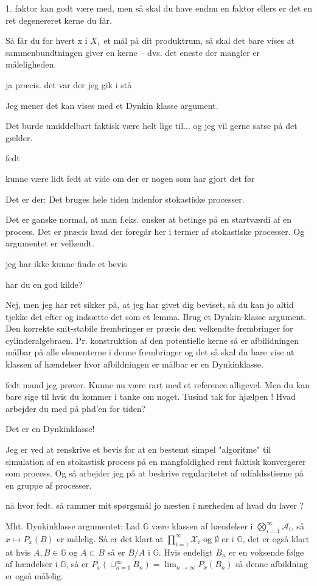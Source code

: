 \documentclass{article}
\begin{document}
1. faktor kan godt være med, men så skal du have endnu en faktor ellers er det en ret degenereret kerne du får.

Så får du for hvert x i $X_1$ et mål på dit produktrum, så skal det bare vises at sammenbundtningen giver en kerne -- dvs. det eneste der mangler er måleligheden.

ja præcis. det var der jeg gik i stå

Jeg mener det kan vises med et Dynkin klasse argument.

Det burde umiddelbart faktisk være helt lige til... og jeg vil gerne satse på det gælder.

fedt

kunne være lidt fedt at vide om der er nogen som har gjort det før

Det er der: Det bruges hele tiden indenfor stokastiske processer.

Det er ganske normal, at man f.eks. ønsker at betinge på en startværdi af en process. Det er præcis hvad der foregår her i termer af stokastiske processer. Og argumentet er velkendt.

jeg har ikke kunne finde et bevis

har du en god kilde?

Nej, men jeg har ret sikker på, at jeg har givet dig beviset, så du kan jo altid tjekke det efter og indsætte det som et lemma. Brug et Dynkin-klasse argument. Den korrekte snit-stabile frembringer er præcis den velkendte frembringer for cylinderalgebraen. Pr. konstruktion af den potentielle kerne så er afbilidningen målbar på alle elementerne i denne frembringer og det så skal du bare vise at klassen af hændelser hvor afbildningen er målbar er en Dynkinklasse.

fedt mand jeg prøver. Kunne nu være rart med et reference alligevel. Men du kan bare sige til hvis du kommer i tanke om noget. Tusind tak for hjælpen ! Hvad arbejder du med på phd’en for tiden?

Det er en Dynkinklasse! 

Jeg er ved at renskrive et bevis for at en bestemt simpel "algoritme" til simulation af en stokastisk process på en mangfoldighed rent faktisk konvergerer som process. Og så arbejder jeg på at beskrive regularitetet af udfaldsstierne på en gruppe af processer.

nå hvor fedt. så rammer mit spørgsmål jo næsten i nærheden af hvad du laver ?

Mht. Dynkinklasse argumentet: Lad $\mathbb G$ være klassen  af hændelser i $\bigotimes_{i=1}^\infty \mathcal A_i$, så $x\mapsto P_x(B)$ er målelig.  Så er det klart at $\prod_{i=1}^\infty \mathcal X_i$ og $\emptyset$ er i $\mathbb G$, det er også klart at hvis $A, B \in \mathbb G$ og $A\subset B$ så er $B\slash A$ i $\mathbb G$. Hvis endeligt $B_n$ er en voksende følge af hændelser i $\mathbb G$, så er $P_x(\cup_{n=1}^\infty B_n) = \lim_{n\to \infty} P_x(B_n)$ så denne afbildning er også målelig.
\end{document}
